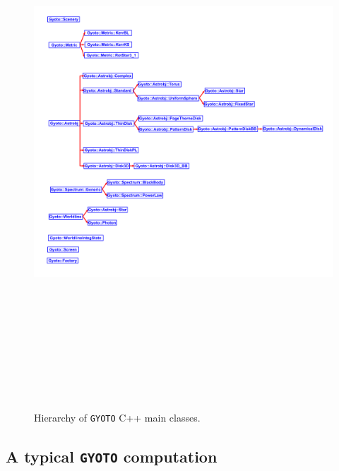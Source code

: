 \documentclass[a4paper,12pt]{article}
\begin{document}
\begin{figure}[htbp]
\centering
\includegraphics[width=18cm,height=20cm]{ClassHierarch.pdf}
\caption{Hierarchy of \texttt{GYOTO} C++ main classes.}
\label{fig:hierarch}
\end{figure}

\subsection{A typical \texttt{GYOTO} computation}
\end{document}
